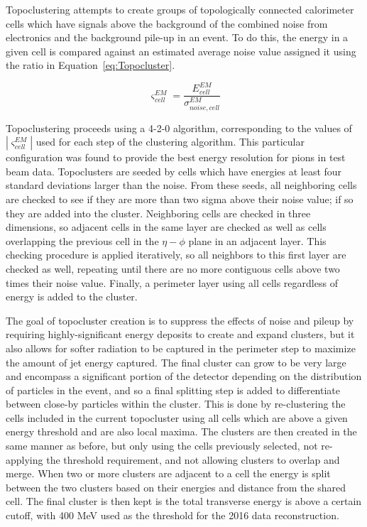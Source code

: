 Topoclustering attempts to create groups of topologically connected calorimeter cells which have signals above the background of the combined noise from electronics and the background pile-up in an event.  To do this, the energy in a given cell is compared against an estimated average noise value assigned it using the ratio in Equation~\ref{eq:Topocluster}.

\begin{equation}
\varsigma^{EM}_{cell} = \frac{E^{EM}_{cell}}{\sigma^{EM}_{noise,cell}}
\label{eq:Topocluster}
\end{equation}

Topoclustering proceeds using a 4-2-0 algorithm, corresponding to the values of $|\varsigma^{EM}_{cell}|$ used for each step of the clustering algorithm.  This particular configuration was found to provide the best energy resolution for pions in test beam data.\cite{Topoclustering420}  Topoclusters are seeded by cells which have energies at least four standard deviations larger than the noise.  From these seeds, all neighboring cells are checked to see if they are more than two sigma above their noise value; if so they are added into the cluster.  Neighboring cells are checked in three dimensions, so adjacent cells in the same layer are checked as well as cells overlapping the previous cell in the $\eta-\phi$ plane in an adjacent layer.  This checking procedure is applied iteratively, so all neighbors to this first layer are checked as well, repeating until there are no more contiguous cells above two times their noise value.  Finally, a perimeter layer using all cells regardless of energy is added to the cluster.

The goal of topocluster creation is to suppress the effects of noise and pileup by requiring highly-significant energy deposits to create and expand clusters, but it also allows for softer radiation to be captured in the perimeter step to maximize the amount of jet energy captured.  The final cluster can grow to be very large and encompass a significant portion of the detector depending on the distribution of particles in the event, and so a final splitting step is added to differentiate between close-by particles within the cluster.  This is done by re-clustering the cells included in the current topocluster using all cells which are above a given energy threshold and are also local maxima.\cite{LArTopoclustering}  The clusters are then created in the same manner as before, but only using the cells previously selected, not re-applying the threshold requirement, and not allowing clusters to overlap and merge.  When two or more clusters are adjacent to a cell the energy is split between the two clusters based on their energies and distance from the shared cell.  The final cluster is then kept is the total transverse energy is above a certain cutoff, with 400 MeV used as the threshold for the 2016 data reconstruction.

